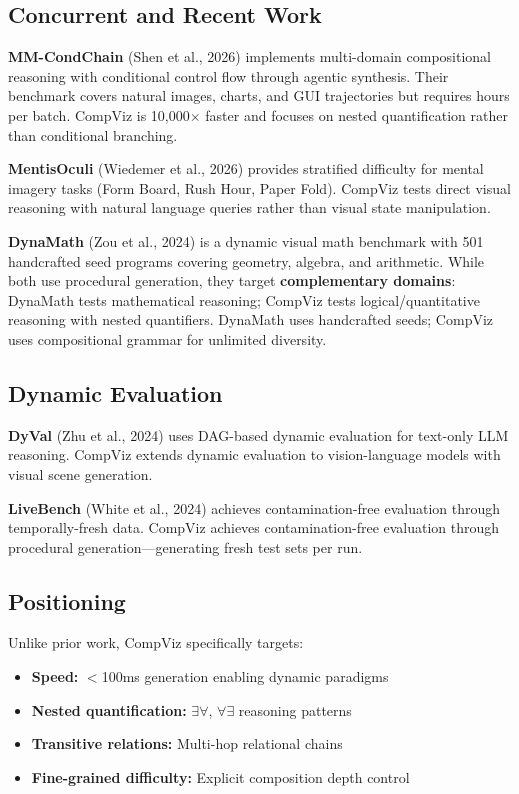 \documentclass[11pt,a4paper]{article}
\begin{document}
\subsection{Concurrent and Recent Work}

\textbf{MM-CondChain} (Shen et al., 2026) implements multi-domain compositional reasoning with conditional control flow through agentic synthesis. Their benchmark covers natural images, charts, and GUI trajectories but requires hours per batch. CompViz is 10,000$\times$ faster and focuses on nested quantification rather than conditional branching.

\textbf{MentisOculi} (Wiedemer et al., 2026) provides stratified difficulty for mental imagery tasks (Form Board, Rush Hour, Paper Fold). CompViz tests direct visual reasoning with natural language queries rather than visual state manipulation.

\textbf{DynaMath} (Zou et al., 2024) is a dynamic visual math benchmark with 501 handcrafted seed programs covering geometry, algebra, and arithmetic. While both use procedural generation, they target \textbf{complementary domains}: DynaMath tests mathematical reasoning; CompViz tests logical/quantitative reasoning with nested quantifiers. DynaMath uses handcrafted seeds; CompViz uses compositional grammar for unlimited diversity.

\subsection{Dynamic Evaluation}

\textbf{DyVal} (Zhu et al., 2024) uses DAG-based dynamic evaluation for text-only LLM reasoning. CompViz extends dynamic evaluation to vision-language models with visual scene generation.

\textbf{LiveBench} (White et al., 2024) achieves contamination-free evaluation through temporally-fresh data. CompViz achieves contamination-free evaluation through procedural generation---generating fresh test sets per run.

\subsection{Positioning}

Unlike prior work, CompViz specifically targets:
\begin{itemize}
    \item \textbf{Speed:} $<$100ms generation enabling dynamic paradigms
    \item \textbf{Nested quantification:} $\exists\forall$, $\forall\exists$ reasoning patterns
    \item \textbf{Transitive relations:} Multi-hop relational chains
    \item \textbf{Fine-grained difficulty:} Explicit composition depth control
\end{itemize}
\end{document}
